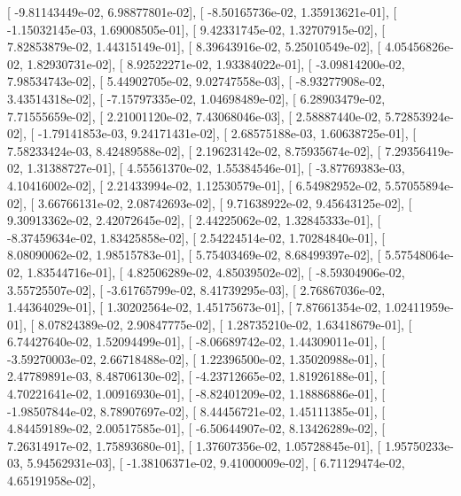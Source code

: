 \documentclass{article}
\begin{document}
       [ -9.81143449e-02,   6.98877801e-02],
       [ -8.50165736e-02,   1.35913621e-01],
       [ -1.15032145e-03,   1.69008505e-01],
       [  9.42331745e-02,   1.32707915e-02],
       [  7.82853879e-02,   1.44315149e-01],
       [  8.39643916e-02,   5.25010549e-02],
       [  4.05456826e-02,   1.82930731e-02],
       [  8.92522271e-02,   1.93384022e-01],
       [ -3.09814200e-02,   7.98534743e-02],
       [  5.44902705e-02,   9.02747558e-03],
       [ -8.93277908e-02,   3.43514318e-02],
       [ -7.15797335e-02,   1.04698489e-02],
       [  6.28903479e-02,   7.71555659e-02],
       [  2.21001120e-02,   7.43068046e-03],
       [  2.58887440e-02,   5.72853924e-02],
       [ -1.79141853e-03,   9.24171431e-02],
       [  2.68575188e-03,   1.60638725e-01],
       [  7.58233424e-03,   8.42489588e-02],
       [  2.19623142e-02,   8.75935674e-02],
       [  7.29356419e-02,   1.31388727e-01],
       [  4.55561370e-02,   1.55384546e-01],
       [ -3.87769383e-03,   4.10416002e-02],
       [  2.21433994e-02,   1.12530579e-01],
       [  6.54982952e-02,   5.57055894e-02],
       [  3.66766131e-02,   2.08742693e-02],
       [  9.71638922e-02,   9.45643125e-02],
       [  9.30913362e-02,   2.42072645e-02],
       [  2.44225062e-02,   1.32845333e-01],
       [ -8.37459634e-02,   1.83425858e-02],
       [  2.54224514e-02,   1.70284840e-01],
       [  8.08090062e-02,   1.98515783e-01],
       [  5.75403469e-02,   8.68499397e-02],
       [  5.57548064e-02,   1.83544716e-01],
       [  4.82506289e-02,   4.85039502e-02],
       [ -8.59304906e-02,   3.55725507e-02],
       [ -3.61765799e-02,   8.41739295e-03],
       [  2.76867036e-02,   1.44364029e-01],
       [  1.30202564e-02,   1.45175673e-01],
       [  7.87661354e-02,   1.02411959e-01],
       [  8.07824389e-02,   2.90847775e-02],
       [  1.28735210e-02,   1.63418679e-01],
       [  6.74427640e-02,   1.52094499e-01],
       [ -8.06689742e-02,   1.44309011e-01],
       [ -3.59270003e-02,   2.66718488e-02],
       [  1.22396500e-02,   1.35020988e-01],
       [  2.47789891e-03,   8.48706130e-02],
       [ -4.23712665e-02,   1.81926188e-01],
       [  4.70221641e-02,   1.00916930e-01],
       [ -8.82401209e-02,   1.18886886e-01],
       [ -1.98507844e-02,   8.78907697e-02],
       [  8.44456721e-02,   1.45111385e-01],
       [  4.84459189e-02,   2.00517585e-01],
       [ -6.50644907e-02,   8.13426289e-02],
       [  7.26314917e-02,   1.75893680e-01],
       [  1.37607356e-02,   1.05728845e-01],
       [  1.95750233e-03,   5.94562931e-03],
       [ -1.38106371e-02,   9.41000009e-02],
       [  6.71129474e-02,   4.65191958e-02],
\end{document}
